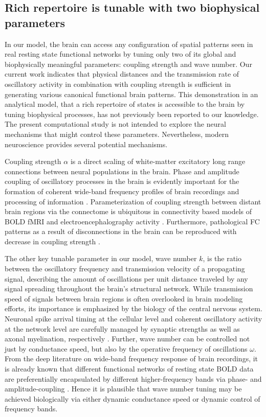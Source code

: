 \documentclass{article}
\begin{document}
\subsection{Rich repertoire is tunable with two biophysical parameters}
In our model, the brain can access any configuration of spatial patterns seen in real resting state functional networks by tuning only two of its global and biophysically meaningful parameters: coupling strength and wave number. Our current work indicates that physical distances and the transmission rate of oscillatory activity in combination with coupling strength is sufficient in generating various canonical functional brain patterns. This demonstration in an analytical model, that a rich repertoire of states is accessible to the brain by tuning biophysical processes, has not previously been reported to our knowledge. The present computational study is not intended to explore the neural mechanisms that might control these parameters. Nevertheless, modern neuroscience provides several potential mechanisms. 

Coupling strength $\alpha$ is a direct scaling of white-matter excitatory long range connections between neural populations in the brain. Phase and amplitude coupling of oscillatory processes in the brain is evidently important for the formation of coherent wide-band frequency profiles of brain recordings and processing of information \cite{fries_mechanism_2005, schnitzler_normal_2005, varela_brainweb_2001, ghosh_cortical_2008, Deco2009}. Parameterization of coupling strength between distant brain regions via the connectome is ubiquitous in connectivity based models of BOLD fMRI \cite{Honey2007, Deco2009, Honey2009, abdelnour_network_2014} and electroencephalography activity \cite{Ghosh2008, Spiegler2013, David2003}. Furthermore, pathological FC patterns as a result of disconnections in the brain can be reproduced with decrease in coupling strength \cite{cabral_modeling_2012, Jirsa2010}. 

The other key tunable parameter in our model, wave number $k$, is the ratio between the oscillatory frequency and transmission velocity of a propagating signal, describing the amount of oscillations per unit distance traveled by any signal spreading throughout the brain's structural network. While transmission speed of signals between brain regions is often overlooked in brain modeling efforts, its importance is emphasized by the biology of the central nervous system. Neuronal spike arrival timing at the cellular level and coherent oscillatory activity at the network level are carefully managed by synaptic strengths as well as axonal myelination, respectively \cite{arancibia-carcamo_node_2017, fields_new_2015}. Further, wave number can be controlled not just by conductance speed, but also by the operative frequency of oscillations $\omega$. From the deep literature on wide-band frequency response of brain recordings, it is already known that different functional networks of resting state BOLD data are preferentially encapsulated by different higher-frequency bands via phase- and amplitude-coupling \cite{ghosh_cortical_2008, Deco2009}. Hence it is plausible that wave number tuning may be achieved biologically via either dynamic conductance speed or dynamic control of frequency bands.
\end{document}
